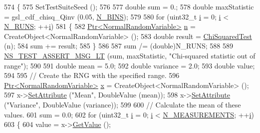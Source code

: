 \begin{DoxyCode}
574 \{
575   SetTestSuiteSeed ();
576 
577   \textcolor{keywordtype}{double} sum = 0.;
578   \textcolor{keywordtype}{double} maxStatistic = gsl\_cdf\_chisq\_Qinv (0.05, \hyperlink{classRandomVariableStreamNormalTestCase_a0adaeedb952b593d21ebd9915597837d}{N\_BINS});
579 
580   \textcolor{keywordflow}{for} (uint32\_t \hyperlink{bernuolliDistribution_8m_a6f6ccfcf58b31cb6412107d9d5281426}{i} = 0; \hyperlink{bernuolliDistribution_8m_a6f6ccfcf58b31cb6412107d9d5281426}{i} < \hyperlink{classRandomVariableStreamNormalTestCase_a6ba9c6a6a0f6f62446ddb88804fde2bd}{N\_RUNS}; ++\hyperlink{bernuolliDistribution_8m_a6f6ccfcf58b31cb6412107d9d5281426}{i})
581     \{
582       \hyperlink{classns3_1_1Ptr}{Ptr<NormalRandomVariable>} \hyperlink{namespacesample-rng-plot_aeb5ee5c431e338ef39b7ac5431242e1d}{n} = CreateObject<NormalRandomVariable> ();
583       \textcolor{keywordtype}{double} result = \hyperlink{classRandomVariableStreamNormalTestCase_a4217d718d419aead140f0204f74990de}{ChiSquaredTest} (n);
584       sum += result;
585     \}
586 
587   sum /= (double)N\_RUNS;
588 
589   \hyperlink{group__testing_ga1d96848b91407c9a0b36583e8b0ad7ae}{NS\_TEST\_ASSERT\_MSG\_LT} (sum, maxStatistic, \textcolor{stringliteral}{"Chi-squared statistic out of range"});
590 
591   \textcolor{keywordtype}{double} mean = 5.0;
592   \textcolor{keywordtype}{double} variance = 2.0;
593   \textcolor{keywordtype}{double} value;
594 
595   \textcolor{comment}{// Create the RNG with the specified range.}
596   \hyperlink{classns3_1_1Ptr}{Ptr<NormalRandomVariable>} \hyperlink{lte__link__budget__x2__handover__measures_8m_a9336ebf25087d91c818ee6e9ec29f8c1}{x} = CreateObject<NormalRandomVariable> ();
597   x->\hyperlink{classns3_1_1ObjectBase_ac60245d3ea4123bbc9b1d391f1f6592f}{SetAttribute} (\textcolor{stringliteral}{"Mean"}, DoubleValue (mean));
598   x->\hyperlink{classns3_1_1ObjectBase_ac60245d3ea4123bbc9b1d391f1f6592f}{SetAttribute} (\textcolor{stringliteral}{"Variance"}, DoubleValue (variance));
599 
600   \textcolor{comment}{// Calculate the mean of these values.}
601   sum = 0.0;
602   \textcolor{keywordflow}{for} (uint32\_t \hyperlink{bernuolliDistribution_8m_a6f6ccfcf58b31cb6412107d9d5281426}{i} = 0; \hyperlink{bernuolliDistribution_8m_a6f6ccfcf58b31cb6412107d9d5281426}{i} < \hyperlink{classRandomVariableStreamNormalTestCase_a8aa4e12111094e204d6019bb0c48b4cf}{N\_MEASUREMENTS}; ++\hyperlink{bernuolliDistribution_8m_a6f6ccfcf58b31cb6412107d9d5281426}{i})
603     \{
604       value = x->\hyperlink{classns3_1_1NormalRandomVariable_a0134d131477bc439cc6ff7cbe84b03a9}{GetValue} ();

\end{DoxyCode}
